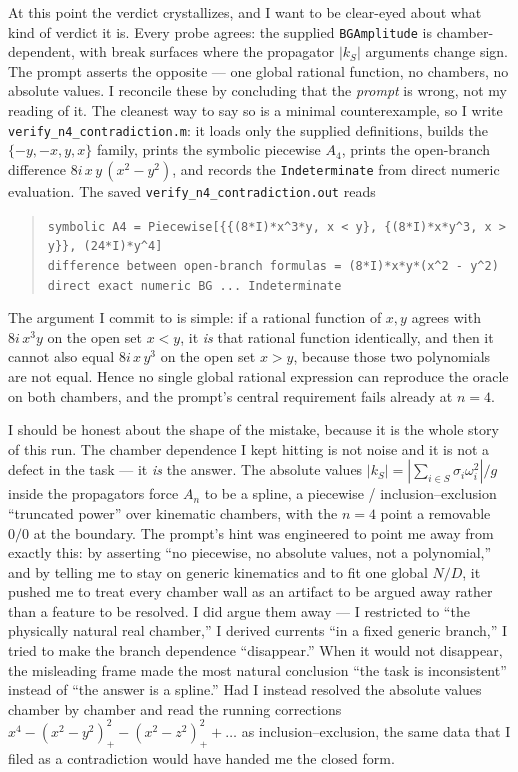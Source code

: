 \documentclass{article}
\begin{document}
At this point the verdict crystallizes, and I want to be clear-eyed about what
kind of verdict it is. Every probe agrees: the supplied \texttt{BGAmplitude} is
chamber-dependent, with break surfaces where the propagator $|k_S|$ arguments
change sign. The prompt asserts the opposite --- one global rational function,
no chambers, no absolute values. I reconcile these by concluding that the
\emph{prompt} is wrong, not my reading of it. The cleanest way to say so is a
minimal counterexample, so I write \texttt{verify\_n4\_contradiction.m}: it
loads only the supplied definitions, builds the $\{-y,-x,y,x\}$ family, prints
the symbolic piecewise $A_4$, prints the open-branch difference
$8i\,x\,y\,(x^2-y^2)$, and records the \texttt{Indeterminate} from direct numeric
evaluation. The saved \texttt{verify\_n4\_contradiction.out} reads
\begin{quote}\small
\texttt{symbolic A4 = Piecewise[\{\{(8*I)*x\^{}3*y, x < y\}, \{(8*I)*x*y\^{}3, x > y\}\}, (24*I)*y\^{}4]}\\
\texttt{difference between open-branch formulas = (8*I)*x*y*(x\^{}2 - y\^{}2)}\\
\texttt{direct exact numeric BG ... Indeterminate}
\end{quote}
The argument I commit to is simple: if a rational function of $x,y$ agrees with
$8i\,x^3y$ on the open set $x<y$, it \emph{is} that rational function
identically, and then it cannot also equal $8i\,x\,y^3$ on the open set $x>y$,
because those two polynomials are not equal. Hence no single global rational
expression can reproduce the oracle on both chambers, and the prompt's central
requirement fails already at $n=4$.

I should be honest about the shape of the mistake, because it is the whole
story of this run. The chamber dependence I kept hitting is not noise and it is
not a defect in the task --- it \emph{is} the answer. The absolute values
$|k_S|=|\sum_{i\in S}\sigma_i\omega_i^2|/g$ inside the propagators force $A_n$
to be a spline, a piecewise / inclusion--exclusion ``truncated power'' over
kinematic chambers, with the $n=4$ point a removable $0/0$ at the boundary. The
prompt's hint was engineered to point me away from exactly this: by asserting
``no piecewise, no absolute values, not a polynomial,'' and by telling me to
stay on generic kinematics and to fit one global $N/D$, it pushed me to treat
every chamber wall as an artifact to be argued away rather than a feature to be
resolved. I did argue them away --- I restricted to ``the physically natural
real chamber,'' I derived currents ``in a fixed generic branch,'' I tried to
make the branch dependence ``disappear.'' When it would not disappear, the
misleading frame made the most natural conclusion ``the task is inconsistent''
instead of ``the answer is a spline.'' Had I instead resolved the absolute
values chamber by chamber and read the running corrections
$x^4-(x^2-y^2)_+^2-(x^2-z^2)_+^2+\dots$ as inclusion--exclusion, the same data
that I filed as a contradiction would have handed me the closed form.
\end{document}
